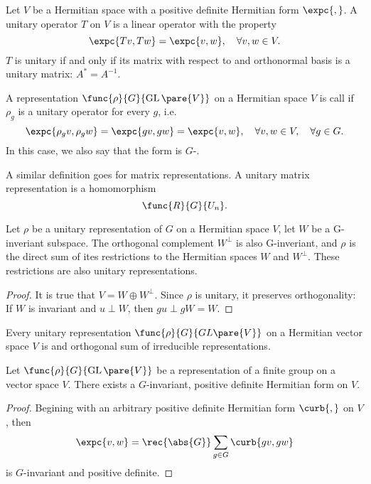 \documentclass[hidelinks]{article}
\DeclareMathOperator{\GL}{GL}
\let\oldgloss\gloss
\def\gloss#1{\textnormal{\textbf{\oldgloss{#1}}}}
\begin{document}
Let $V$ be a Hermitian space with a positive definite Hermitian form $\expc{,}$. A unitary operator $T$ on $V$ is a linear operator with the property
\[ \expc{Tv,Tw} = \expc{v,w},\quad \forall v,w\in V. \]
$T$ is unitary if and only if its matrix with respect to and orthonormal basis is a unitary matrix: $A^* = A^{-1}$.
\begin{definition}
    A representation $\func{\rho}{G}{\GL\pare{V}}$ on a Hermitian space $V$ is call  if $\rho_g$ is a unitary operator for every $g$, i.e.
    \[ \expc{\rho_gv,\rho_gw} = \expc{gv,gw} = \expc{v,w},\quad \forall v,w\in V,\quad \forall g\in G. \]
    In this case, we also say that the form is $G$-.
\end{definition}
A similar definition goes for matrix representations. A unitary matrix representation is a homomorphism
\[ \func{R}{G}{U_n}. \]
\begin{lemma}
    Let $\rho$ be a unitary representation of $G$ on a Hermitian space $V$, let $W$ be a G-inveriant subspace. The orthogonal complement $W^\perp$ is also G-inveriant, and $\rho$ is the direct sum of ites restrictions to the Hermitian spaces $W$ and $W^\perp$. These restrictions are also unitary representations.
\end{lemma}
\begin{proof}
    It is true that $V = W\oplus W^\perp$. Since $\rho$ is unitary, it preserves orthogonality: If $W$ is invariant and $u\perp W$, then $gu\perp gW = W$.
\end{proof}
\begin{corollary}
    Every unitary representation $\func{\rho}{G}{GL\pare{V}}$ on a Hermitian vector space $V$ is and orthogonal sum of irreducible representations.
\end{corollary}
\begin{theorem}
    Let $\func{\rho}{G}{\GL\pare{V}}$ be a representation of a finite group on a vector space $V$. There exists a $G$-invariant, positive definite Hermitian form on $V$.
\end{theorem}
\begin{proof}
    Begining with an arbitrary positive definite Hermitian form $\curb{,}$ on $V$, then
    \[ \expc{v,w} = \rec{\abs{G}}\sum_{g\in G} \curb{gv,gw} \]
    is $G$-invariant and positive definite.
\end{proof}
\end{document}
